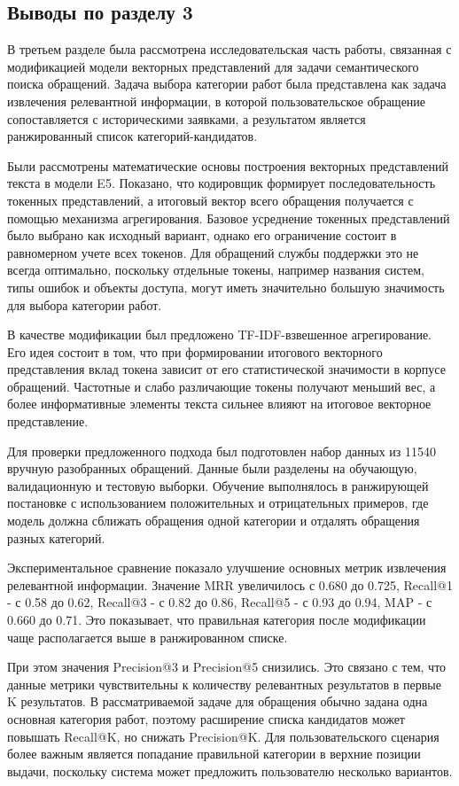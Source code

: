 \documentclass[14pt,a4paper]{extarticle}
\numberwithin{figure}{section}
\numberwithin{table}{section}
\begin{document}
\subsection{Выводы по разделу 3}

В третьем разделе была рассмотрена исследовательская часть работы,
связанная с модификацией модели векторных представлений для задачи семантического
поиска обращений. Задача выбора категории работ была представлена как
задача извлечения релевантной информации, в которой пользовательское обращение сопоставляется с
историческими заявками, а результатом является ранжированный список
категорий-кандидатов.

Были рассмотрены математические основы построения векторных представлений текста в
модели E5. Показано, что кодировщик формирует последовательность токенных
представлений, а итоговый вектор всего обращения получается с помощью
механизма агрегирования. Базовое усреднение токенных представлений было выбрано как исходный вариант,
однако его ограничение состоит в равномерном учете всех токенов. Для
обращений службы поддержки это не всегда оптимально, поскольку отдельные
токены, например названия систем, типы ошибок и объекты доступа, могут
иметь значительно большую значимость для выбора категории работ.

В качестве модификации был предложено TF-IDF-взвешенное агрегирование. Его идея
состоит в том, что при формировании итогового векторного представления вклад токена
зависит от его статистической значимости в корпусе обращений. Частотные
и слабо различающие токены получают меньший вес, а более информативные
элементы текста сильнее влияют на итоговое векторное представление.

Для проверки предложенного подхода был подготовлен набор данных из 11540
вручную разобранных обращений. Данные были разделены на обучающую,
валидационную и тестовую выборки. Обучение выполнялось в
ранжирующей постановке с использованием положительных и отрицательных
примеров, где модель должна сближать обращения одной категории и
отдалять обращения разных категорий.

Экспериментальное сравнение показало улучшение основных
метрик извлечения релевантной информации. Значение MRR увеличилось с 0.680 до 0.725, Recall@1 -
с 0.58 до 0.62, Recall@3 - с 0.82 до 0.86, Recall@5 - с 0.93 до 0.94,
MAP - с 0.660 до 0.71. Это показывает, что правильная категория после
модификации чаще располагается выше в ранжированном списке.

При этом значения Precision@3 и Precision@5 снизились. Это связано с
тем, что данные метрики чувствительны к количеству релевантных
результатов в первые K результатов. В рассматриваемой задаче для обращения обычно
задана одна основная категория работ, поэтому расширение списка
кандидатов может повышать Recall@K, но снижать Precision@K. Для
пользовательского сценария более важным является попадание правильной
категории в верхние позиции выдачи, поскольку система может предложить
пользователю несколько вариантов.
\end{document}
